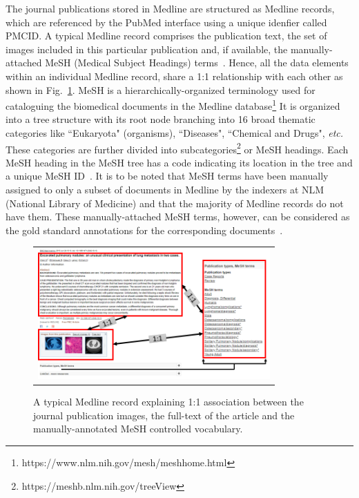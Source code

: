 \documentclass[]{spie}  %
\begin{document}
The journal publications stored in Medline are structured as Medline records, which are referenced by the PubMed interface using a unique idenfier called PMCID. 
A typical Medline record comprises the publication text, the set of images included in this particular publication and, if available, the manually-attached MeSH (Medical Subject Headings) terms~\cite{mesh,pmid28412964}.
Hence, all the data elements within an individual Medline record, share a 1:1 relationship with each other as shown in Fig.~\ref{figure:1_1association}.
MeSH is a hierarchically-organized terminology used for cataloguing the biomedical documents in the Medline database\footnote{https://www.nlm.nih.gov/mesh/meshhome.html}
It is organized into a tree structure with its root node branching into 16 broad thematic categories like ``Eukaryota" (organisms), ``Diseases", ``Chemical and Drugs", \emph{etc.}
These categories are further divided into subcategories\footnote{https://meshb.nlm.nih.gov/treeView} or MeSH headings.
Each MeSH heading in the MeSH tree has a code indicating its location in the tree and a unique MeSH ID~\cite{mesh}.
It is to be noted that MeSH terms have been manually assigned to only a subset of documents in Medline by the indexers at NLM (National Library of Medicine) and that the majority of Medline records do not have them.
These manually-attached MeSH terms, however, can be considered as the gold standard annotations for the corresponding documents~\cite{pmid28412964}.
%
\vspace{5mm}
\begin{figure} [ht]
   \begin{center}
   \begin{tabular}{c} %
   \includegraphics[height=5cm]{one_one_associationPubMed.png}
   \end{tabular}
   \end{center}
   \caption[example] 
   { \label{figure:1_1association} 
A typical Medline record explaining 1:1 association between the journal publication images, the full-text of the article and the manually-annotated MeSH controlled vocabulary.}
\end{figure} 
\vspace{5mm}
%
%
\end{document}
